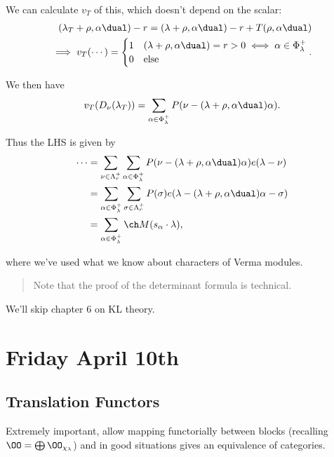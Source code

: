 We can calculate \(v_T\) of this, which doesn't depend on the scalar:
\begin{align*}
(\lambda_T + \rho, \alpha\dual) - r = (\lambda+\rho, \alpha\dual) -r + T(\rho, \alpha\dual)\\
\implies v_T( \cdots ) =
\begin{cases}
1 & (\lambda + \rho, \alpha\dual) = r > 0 \iff \alpha \in \Phi_\lambda^+ \\
0 & \text{else}
\end{cases}
.\end{align*}

We then have \begin{align*}
v_T(D_\nu(\lambda_T)) = \sum_{\alpha \in \Phi^+_\lambda} P(\nu - (\lambda + \rho, \alpha\dual)\alpha)
.\end{align*}

Thus the LHS is given by \begin{align*}
\cdots
&= \sum _{\nu \in \Lambda_r^+} \sum_{\alpha\in \Phi_\lambda^+} P(\nu - (\lambda + \rho, \alpha\dual) \alpha) e(\lambda - \nu) \\
&= \sum _{\alpha \in \Phi_\lambda^+} \sum_{\sigma \in \Lambda_r^+} P(\sigma) e(\lambda - (\lambda + \rho, \alpha\dual)\alpha - \sigma) \\
&= \sum_{\alpha \in \Phi_\lambda^+} \ch M(s_\alpha \cdot \lambda)
,\end{align*}

where we've used what we know about characters of Verma modules.

\begin{quote}
Note that the proof of the determinant formula is technical.
\end{quote}

We'll skip chapter 6 on KL theory.

\hypertarget{friday-april-10th}{%
\section{Friday April 10th}\label{friday-april-10th}}

\hypertarget{translation-functors}{%
\subsection{Translation Functors}\label{translation-functors}}

Extremely important, allow mapping functorially between blocks
(recalling \(\OO = \bigoplus \OO_{\chi_\lambda}\)) and in good
situations gives an equivalence of categories.

